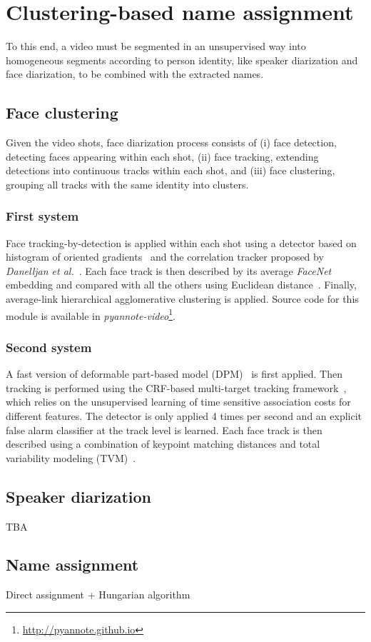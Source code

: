\section{Clustering-based name assignment}
\label{sec:clustering}

To this end, a video must be segmented in an unsupervised way into homogeneous segments according to person identity, like  speaker diarization and face diarization, to be combined with the extracted names.

\subsection{Face clustering}

Given the video shots, face diarization process consists of (i) face detection, detecting faces appearing within each shot, (ii) face tracking, extending detections into continuous tracks within each shot, and (iii) face clustering, grouping all tracks with the same identity into clusters.

\subsubsection{First system}

Face tracking-by-detection is applied within each shot using a detector based on histogram of oriented gradients~\cite{Dalal2005} and the correlation tracker proposed by \emph{Danelljan et al.}~\cite{Danelljan2014}. Each face track is then described by its average \emph{FaceNet} embedding and compared with all the others using Euclidean distance~\cite{Schroff2015}. Finally, average-link hierarchical agglomerative clustering is applied. Source code for this module is available in \emph{pyannote-video}\footnote{\url{http://pyannote.github.io}}.

\subsubsection{Second system}

A fast version of deformable part-based model (DPM)~\cite{felzenszwalb2010dpm,mathias2014face,dubout2013deformable} is first applied. Then tracking is performed using the CRF-based multi-target tracking framework~\cite{heili2014tracking}, which relies on the unsupervised learning of time sensitive association costs for different features.
%
The detector is only applied 4 times per second and an explicit false alarm classifier at the track level is learned\cite{Le_ICPR_2016}.
%
Each face track is then described using a combination of keypoint matching distances and total variability modeling (TVM)~\cite{wallace2011inter,wallace2012total,Khoury:ICMR:2013}.

\subsection{Speaker diarization}

TBA

\subsection{Name assignment}
Direct assignment + Hungarian algorithm

\endinput
